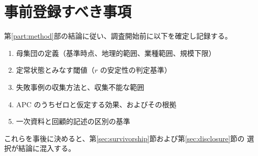 \section{事前登録すべき事項}

第\ref{part:method}部の結論に従い、調査開始前に以下を確定し記録する。

\begin{enumerate}[label=(\arabic*)]
\item 母集団の定義（基準時点、地理的範囲、業種範囲、規模下限）
\item 定常状態とみなす閾値（$r$ の安定性の判定基準）
\item 失敗事例の収集方法と、収集不能な範囲
\item APC のうちゼロと仮定する効果、およびその根拠
\item 一次資料と回顧的記述の区別の基準
\end{enumerate}

これらを事後に決めると、第\ref{sec:survivorship}節および第\ref{sec:disclosure}節の
選択が結論に混入する。

